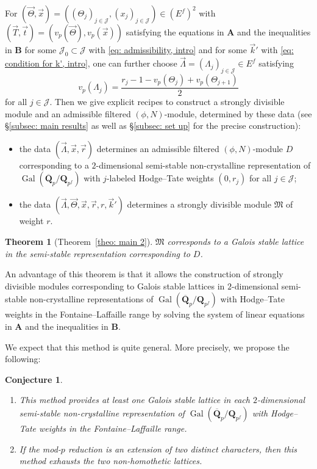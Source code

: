 \documentclass[11pt]{amsart}
\theoremstyle{definition}
\numberwithin{equation}{subsection}
\theoremstyle{plain}
\newtheorem{theo}[equation]{Theorem}
\theoremstyle{plain}
\theoremstyle{plain}
\theoremstyle{plain}
\theoremstyle{plain}
\theoremstyle{plain}
\newtheorem{conj}[equation]{Conjecture}
\theoremstyle{plain}
\theoremstyle{plain}
\theoremstyle{plain}
\theoremstyle{plain}
\theoremstyle{plain}
\theoremstyle{plain}
\theoremstyle{definition}
\theoremstyle{definition}
\theoremstyle{definition}
\theoremstyle{remark}
\renewcommand{\(}{\textup{(}}
\renewcommand{\)}{\textup{)}}
\DeclareMathOperator{\Gal}{Gal}
\newcommand{\Q}{\mathbf{Q}}
\newcommand{\fM}{\mathfrak{M}}
\newcommand{\cJ}{\mathcal{J}}
\newcommand{\vx}{\vec{x}}
\newcommand{\vr}{\vec{r}}
\newcommand{\vk}{\vec{k}}
\newcommand{\vLam}{\vec{\Lambda}}
\newcommand{\vTh}{\vec{\Theta}}
\begin{document}
For $(\vTh,\vx)=((\Theta_j)_{j\in\cJ},(x_j)_{j\in\cJ})\in (E^f)^{2}$ with $(\vec{T},\vec{t})=(v_p(\vTh),v_p(\vx))$ satisfying the equations in \textbf{A} and the inequalities in \textbf{B} for some $\cJ_0\subset\cJ$ with \eqref{eq: admissibility, intro} and for some $\vk'$ with \eqref{eq: condition for k', intro}, one can further choose $\vLam=(\Lambda_j)_{j\in\cJ}\in E^f$ satisfying
\begin{equation}\label{eq: definition of Lambda, intro}
v_p(\Lambda_j)=\frac{r_j-1-v_p(\Theta_j)+v_p(\Theta_{j+1})}{2}
\end{equation}
for all $j\in\cJ$. Then we give explicit recipes to construct a strongly divisible module and an admissible filtered $(\phi,N)$-module, determined by these data (see \S\ref{subsec: main results} as well as \S\ref{subsec: set up} for the precise construction):
\begin{itemize}[leftmargin=*]
\item the data $(\vLam,\vx,\vr)$ determines an admissible filtered $(\phi,N)$-module $D$ corresponding to a $2$-dimensional semi-stable non-crystalline representation of $\Gal(\overline{\Q}_p/\Q_{p^f})$ with $j$-labeled Hodge--Tate weights $(0,r_j)$ for all $j\in\cJ$;
\item the data $(\vLam,\vTh,\vx,\vr,r,\vk')$ determines a strongly divisible module $\fM$ of weight $r$.
\end{itemize}

\begin{theo}[Theorem~\ref{theo: main 2}]
$\fM$ corresponds to a Galois stable lattice in the semi-stable representation corresponding to $D$.
\end{theo}

An advantage of this theorem is that it allows the construction of strongly divisible modules corresponding to Galois stable lattices in $2$-dimensional semi-stable non-crystalline representations of $\Gal(\overline{\Q}_p/\Q_{p^f})$ with Hodge--Tate weights in the Fontaine--Laffaille range by solving the system of linear equations in \textbf{A} and the inequalities in \textbf{B}.

We expect that this method is quite general. More precisely, we propose the following:

\begin{conj}\label{conj: exhaust} 
\begin{enumerate}[leftmargin=*] 
\item This method provides at least one Galois stable lattice in each $2$-dimensional semi-stable non-crystalline representation of $\Gal(\overline{\Q}_p/\Q_{p^f})$ with Hodge--Tate weights in the Fontaine--Laffaille range. 
\item If the mod-$p$ reduction is an extension of two distinct characters, then this method exhausts the two non-homothetic lattices.
\end{enumerate}
\end{conj}
\end{document}
